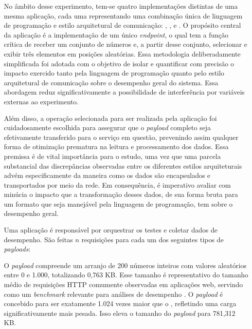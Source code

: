 No âmbito desse experimento, tem-se quatro implementações distintas de uma mesma aplicação, cada uma representando uma combinação única de linguagem de programação e estilo arquitetural de comunicação: \gogrpc{}, \gorest{}, \javagrpc{} e \javarest{}.
O propósito central da aplicação é a implementação de um único \textit{endpoint}, o qual tem a função crítica de receber um conjunto de números e, a partir desse conjunto, selecionar e exibir três elementos em posições aleatórias.
Essa metodologia deliberadamente simplificada foi adotada com o objetivo de isolar e quantificar com precisão o impacto exercido tanto pela linguagem de programação quanto pelo estilo arquitetural de comunicação sobre o desempenho geral do sistema. Essa abordagem reduz significativamente a possibilidade de interferência por variáveis externas ao experimento.

Além disso, a operação selecionada para ser realizada pela aplicação foi cuidadosamente escolhida para assegurar que o \textit{payload} completo seja efetivamente transferido para o serviço em questão, prevenindo assim qualquer forma de otimização prematura na leitura e processamento dos dados.
Essa premissa é de vital importância para o estudo, uma vez que uma parcela substancial das discrepâncias observadas entre os diferentes estilos arquiteturais advém especificamente da maneira como os dados são encapsulados e transportados por meio da rede.
Em consequência, é imperativo avaliar com minúcia o impacto que a transformação desses dados, de sua forma bruta para um formato que seja manejável pela linguagem de programação, tem sobre o desempenho geral.

Uma aplicação
é responsável por orquestrar os testes e coletar dados de desempenho.
%
São feitas $n$ requisições para cada um dos seguintes tipos de \textit{payloads}:

O \textit{payload}  compreende um arranjo de 200 números inteiros com valores aleatórios entre 0 e 1.000, totalizando 0,763 KB.
Esse tamanho é representativo do tamanho médio de requisições HTTP comumente observadas em aplicações web, servindo como um \textit{benchmark} relevante para análises de desempenho \cite{chromium2012spdy}.
%
O \textit{payload}  \space é concebido para ser exatamente 1.024 vezes maior que o , refletindo uma carga significativamente mais pesada. Isso eleva o tamanho do \textit{payload}  para 781,312 KB. 


